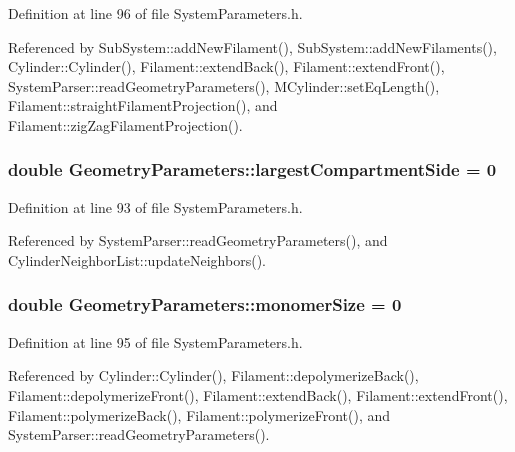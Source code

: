 Definition at line 96 of file System\+Parameters.\+h.



Referenced by Sub\+System\+::add\+New\+Filament(), Sub\+System\+::add\+New\+Filaments(), Cylinder\+::\+Cylinder(), Filament\+::extend\+Back(), Filament\+::extend\+Front(), System\+Parser\+::read\+Geometry\+Parameters(), M\+Cylinder\+::set\+Eq\+Length(), Filament\+::straight\+Filament\+Projection(), and Filament\+::zig\+Zag\+Filament\+Projection().

\hypertarget{structGeometryParameters_a0b14f97d476bd4d40bf32a75715814b0}{
\subsubsection[{largest\+Compartment\+Side}]{\setlength{\rightskip}{0pt plus 5cm}double Geometry\+Parameters\+::largest\+Compartment\+Side = 0}}\label{structGeometryParameters_a0b14f97d476bd4d40bf32a75715814b0}


Definition at line 93 of file System\+Parameters.\+h.



Referenced by System\+Parser\+::read\+Geometry\+Parameters(), and Cylinder\+Neighbor\+List\+::update\+Neighbors().

\hypertarget{structGeometryParameters_a7afc14cf30bc80757522bcabe8fb3bc9}{
\subsubsection[{monomer\+Size}]{\setlength{\rightskip}{0pt plus 5cm}double Geometry\+Parameters\+::monomer\+Size = 0}}\label{structGeometryParameters_a7afc14cf30bc80757522bcabe8fb3bc9}


Definition at line 95 of file System\+Parameters.\+h.



Referenced by Cylinder\+::\+Cylinder(), Filament\+::depolymerize\+Back(), Filament\+::depolymerize\+Front(), Filament\+::extend\+Back(), Filament\+::extend\+Front(), Filament\+::polymerize\+Back(), Filament\+::polymerize\+Front(), and System\+Parser\+::read\+Geometry\+Parameters().

